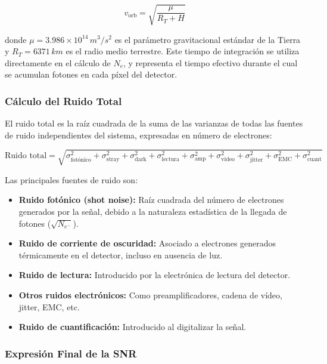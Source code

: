 \begin{equation}
v_{\mathrm{orb}} = \sqrt{\frac{\mu}{R_T + H}}
\end{equation}

donde \( \mu = 3.986 \times 10^{14} \, \si{m^3/s^2} \) es el parámetro gravitacional estándar de la Tierra y \( R_T = 6371 \, \si{km} \) es el radio medio terrestre. Este tiempo de integración se utiliza directamente en el cálculo de \( N_e \), y representa el tiempo efectivo durante el cual se acumulan fotones en cada píxel del detector.

\subsubsection{Cálculo del Ruido Total}

El ruido total es la raíz cuadrada de la suma de las varianzas de todas las fuentes de ruido independientes del sistema, expresadas en número de electrones:

\begin{equation}
\text{Ruido total} = \sqrt{\sigma_{\text{fotónico}}^2 + \sigma_{\text{stray}}^2 + \sigma_{\text{dark}}^2 + \sigma_{\text{lectura}}^2 + \sigma_{\text{amp}}^2 + \sigma_{\text{vídeo}}^2 + \sigma_{\text{jitter}}^2 + \sigma_{\text{EMC}}^2 + \sigma_{\text{cuant}}^2}
\end{equation}

Las principales fuentes de ruido son:

\begin{itemize}
    \item \textbf{Ruido fotónico (shot noise):} Raíz cuadrada del número de electrones generados por la señal, debido a la naturaleza estadística de la llegada de fotones (\( \sqrt{N_{e^-}} \)).
    \item \textbf{Ruido de corriente de oscuridad:} Asociado a electrones generados térmicamente en el detector, incluso en ausencia de luz.
    \item \textbf{Ruido de lectura:} Introducido por la electrónica de lectura del detector.
    \item \textbf{Otros ruidos electrónicos:} Como preamplificadores, cadena de vídeo, jitter, EMC, etc.
    \item \textbf{Ruido de cuantificación:} Introducido al digitalizar la señal.
\end{itemize}

\subsubsection{Expresión Final de la SNR}

